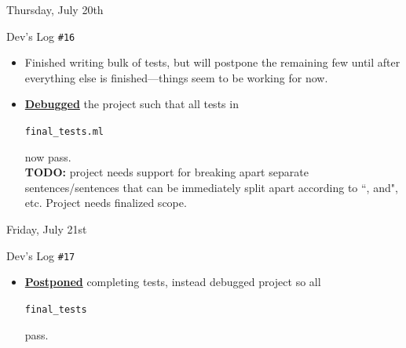 \documentclass[11pt]{article}
\newcommand\codebox[1]{
    \noindent\hspace{-0.25em}\begin{tcolorbox}[on line, hbox, colback = codeblack, colframe = codeborder, coltext = white, boxrule = 1.5pt, left = 2pt, right = 2pt, top = 0.5pt, bottom = 0.5pt]
    \small\texttt{#1}\normalsize
    \end{tcolorbox}\hspace{-0.25em}
}
\begin{document}
\normalsize\begin{bluebox}{Thursday, July 20th\vspace{-2.2em}\begin{flushright}Dev's Log \texttt{\#16}\hspace{0.5cm}\end{flushright}}
    \begin{itemize}  
        \item Finished writing bulk of tests, but will postpone the remaining few until after everything else is finished---things seem to be working for now.
        \vspace{-0.5em}
        \item \href{https://github.com/usnistgov/ngpac/commit/03813d89c6673417f4bdf33e963a6d6e58322776}{\textbf{Debugged}} the project such that all tests in \codebox{final\_tests.ml} now pass. \\
        \textbf{TODO:} project needs support for breaking apart separate sentences/sentences that can be immediately split apart according to ``, and", etc. Project needs finalized scope.
    \end{itemize}
\end{bluebox}

\begin{center}
    \vspace{-0.25em}
    \hspace{0.2cm}
    \vspace{-0.4em}
\end{center}

\normalsize\begin{bluebox}{Friday, July 21st\vspace{-2.2em}\begin{flushright}Dev's Log \texttt{\#17}\hspace{0.5cm}\end{flushright}}
    \begin{itemize}         
        \item\href{https://github.com/usnistgov/ngpac/commit/03813d89c6673417f4bdf33e963a6d6e58322776}{\textbf{Postponed}} completing tests, instead debugged project so all \codebox{final\_tests} pass.   
    \end{itemize}
\end{bluebox}
\end{document}
